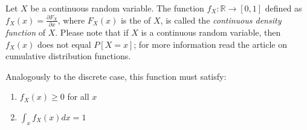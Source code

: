 \documentclass[12pt]{article}
\begin{document}

Let $X$ be a continuous random variable. The function $f_X\colon\mathbb{R} \to [0,1]$ defined as $ f_X(x) = \frac{\partial F_X}{\partial x} $, where $ F_X(x)$ is the  of $X$, is called the \emph{continuous density function} of $X$.
Please note that if $X$ is a continuous random variable, then $f_X(x)$ does not equal $P[X=x]$; for more information read the article on cumulative distribution functions.

Analogously to the discrete case, this function must satisfy:

\begin{enumerate}
\item $f_X(x) \geq 0$ for all $x$
\item $\int_{x}^{} {f_X(x) dx} = 1$
\end{enumerate}
\end{document}
